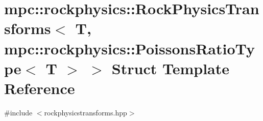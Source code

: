 \hypertarget{structmpc_1_1rockphysics_1_1_rock_physics_transforms_3_01_t_00_01mpc_1_1rockphysics_1_1_poissons_ratio_type_3_01_t_01_4_01_4}{}\section{mpc\+:\+:rockphysics\+:\+:Rock\+Physics\+Transforms$<$ T, mpc\+:\+:rockphysics\+:\+:Poissons\+Ratio\+Type$<$ T $>$ $>$ Struct Template Reference}
\label{structmpc_1_1rockphysics_1_1_rock_physics_transforms_3_01_t_00_01mpc_1_1rockphysics_1_1_poissons_ratio_type_3_01_t_01_4_01_4}


{\ttfamily \#include $<$rockphysicstransforms.\+hpp$>$}

